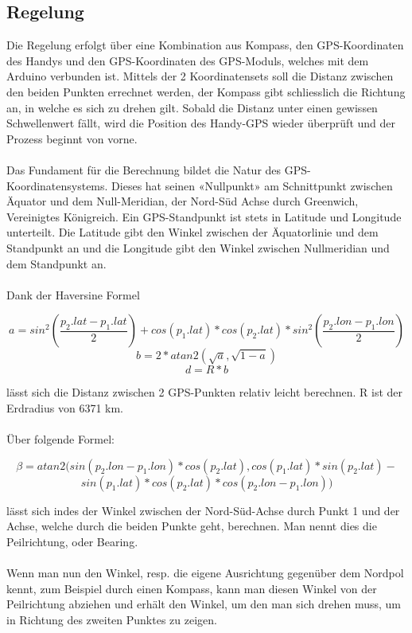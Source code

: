 \subsection{Regelung}
Die Regelung erfolgt über eine Kombination aus Kompass, den GPS-Koordinaten des Handys und den GPS-Koordinaten des GPS-Moduls, welches mit dem Arduino verbunden ist. Mittels der 2 Koordinatensets soll die Distanz zwischen den beiden Punkten errechnet werden, der Kompass gibt schliesslich die Richtung an, in welche es sich zu drehen gilt. Sobald die Distanz unter einen gewissen Schwellenwert fällt, wird die Position des Handy-GPS wieder überprüft und der Prozess beginnt von vorne. 
\\ \\
Das Fundament für die Berechnung bildet die Natur des GPS-Koordinatensystems. Dieses hat seinen «Nullpunkt» am Schnittpunkt zwischen Äquator und dem Null-Meridian, der Nord-Süd Achse durch Greenwich, Vereinigtes Königreich. 
Ein GPS-Standpunkt ist stets in Latitude und Longitude unterteilt. Die Latitude gibt den Winkel zwischen der Äquatorlinie und dem Standpunkt an und die Longitude gibt den Winkel zwischen Nullmeridian und dem Standpunkt an.
\\ \\
Dank der Haversine Formel 

\[a=sin^{2}\left ( \frac{p_{2}.lat-p_{1}.lat}{2} \right )+cos\left ( p_{1}.lat \right )*cos\left ( p_{2}.lat \right )*sin^{2}\left ( \frac{p_{2}.lon-p_{1}.lon}{2} \right )\]
\[b=2*atan2\left ( \sqrt{a},\sqrt{1-a} \right )\]
\[d=R*b\]

lässt sich die Distanz zwischen 2 GPS-Punkten relativ leicht berechnen. R ist der Erdradius von 6371 km. \\ \\
Über folgende Formel:

\[\beta = atan2(sin\left ( p_{2}.lon-p_{1}.lon \right )*cos\left ( p_{2}.lat \right ), cos\left (p_{1}.lat  \right )*sin\left ( p_{2}.lat \right )-\] 
\[sin\left ( p_{1}.lat \right )*cos\left (p_{2}.lat  \right )*cos\left ( p_{2}.lon-p_{1}.lon \right ))\]

lässt sich indes der Winkel zwischen der Nord-Süd-Achse durch Punkt 1 und der Achse, welche durch die beiden Punkte geht, berechnen. Man nennt dies die Peilrichtung, oder Bearing.
\\ \\
Wenn man nun den Winkel, resp. die eigene Ausrichtung gegenüber dem Nordpol kennt, zum Beispiel durch einen Kompass, kann man diesen Winkel von der Peilrichtung abziehen und erhält den Winkel, um den man sich drehen muss, um in Richtung des zweiten Punktes zu zeigen.
